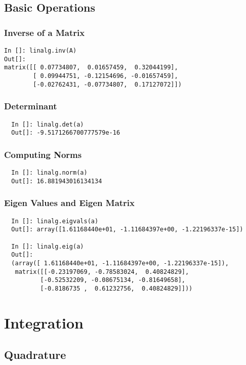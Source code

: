 \documentclass[14pt,compress]{beamer}
\begin{document}
\subsection{Basic Operations}
\begin{frame}[fragile]
\frametitle{Inverse of a Matrix}

\begin{small}
\begin{lstlisting}
In []: linalg.inv(A)
Out[]: 
matrix([[ 0.07734807,  0.01657459,  0.32044199],
        [ 0.09944751, -0.12154696, -0.01657459],
        [-0.02762431, -0.07734807,  0.17127072]])

\end{lstlisting}
\end{small}
\end{frame}

\begin{frame}[fragile]
\frametitle{Determinant}
\begin{lstlisting}
  In []: linalg.det(a)
  Out[]: -9.5171266700777579e-16
\end{lstlisting}
\end{frame}

\begin{frame}[fragile]
\frametitle{Computing Norms}
\begin{lstlisting}
  In []: linalg.norm(a)
  Out[]: 16.881943016134134
\end{lstlisting}
\end{frame}

\begin{frame}[fragile]
\frametitle{Eigen Values and Eigen Matrix}
\begin{small}
\begin{lstlisting}
  In []: linalg.eigvals(a)
  Out[]: array([1.61168440e+01, -1.11684397e+00, -1.22196337e-15])

  In []: linalg.eig(a)
  Out[]: 
  (array([ 1.61168440e+01, -1.11684397e+00, -1.22196337e-15]),
   matrix([[-0.23197069, -0.78583024,  0.40824829],
          [-0.52532209, -0.08675134, -0.81649658],
          [-0.8186735 ,  0.61232756,  0.40824829]]))
\end{lstlisting}
\end{small}
\end{frame}
\section{Integration}

\subsection{Quadrature}
\end{document}
